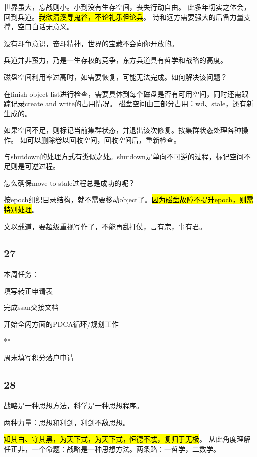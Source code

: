 世界虽大，忘战则小。小到没有生存空间，丧失行动自由。
此多年切实之体会，回到兵道。\hl{我欲清溪寻鬼谷，不论礼乐但论兵}。
诗和远方需要强大的后备力量支撑，空口白话无意义。

没有斗争意识，奋斗精神，世界的宝藏不会向你开放的。

兵道并非蛮力，乃是一生存权的竞争，东方兵道具有哲学和战略的高度。

\hrulefill

磁盘空间利用率过高时，如需要恢复，可能无法完成。如何解决该问题？

在finish object list进行检查，需要具体到每个磁盘是否有可用空间，同时还需跟踪记录create and write的占用情况。
磁盘空间由三部分占用：wd、stale，还有新生成的。

如果空间不足，则标记当前集群状态，并退出该次修复。按集群状态处理各种操作。
如可以删除卷以回收空间，回收空间后，重新检查。

与shutdown的处理方式有类似之处。shutdown是单向不可逆的过程，标记空间不足则是可逆过程。

\hrulefill

怎么确保move to stale过程总是成功的呢？

按epoch组织目录结构，就不需要移动object了。\hl{因为磁盘故障不提升epoch，则需特别处理}。

\hrulefill

文以载道，要超级重视写作了，不能再乱打仗，言有宗，事有君。

\subsection{27}

本周任务：
\begin{enumbox}
\item 填写转正申请表
\item 完成ssan交接文档
\item 开始全闪方面的PDCA循环/规划工作
\item ***
\item 周末填写积分落户申请
\end{enumbox}

\subsection{28}

战略是一种思想方法，科学是一种思想程序。

两种力量：思想和利剑，利剑不敌思想。

\hl{知其白、守其黑，为天下式，为天下式，恒德不忒，复归于无极}。
从此角度理解任正非，一个命题：战略是一种思想方法。两条路：一哲学，二数学。


